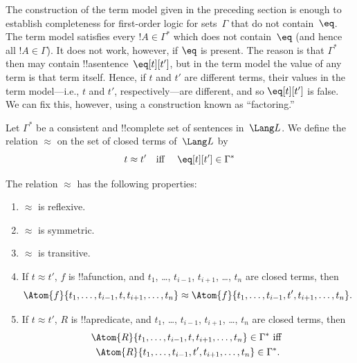 \documentclass[../../../include/open-logic-section]{subfiles}
\begin{document}

\begin{explain}
The construction of the term model given in the preceding section is
enough to establish completeness for first-order logic for
sets~$\Gamma$ that do not contain~$\eq$.  The term model satisfies
every $!A \in \Gamma^*$ which does not contain~$\eq$ (and hence all
$!A \in \Gamma$).  It does not work, however, if $\eq$ is present.
The reason is that $\Gamma^*$ then may contain
!!a{sentence}~$\eq[t][t']$, but in the term model the value of any
term is that term itself.  Hence, if $t$ and $t'$ are different terms,
their values in the term model---i.e., $t$ and $t'$,
respectively---are different, and so $\eq[t][t']$ is false.  We can
fix this, however, using a construction known as ``factoring.''
\end{explain}

\begin{defn}
  Let $\Gamma^*$ be a consistent and !!{complete} set of sentences
  in~$\Lang L$.  We define the relation $\approx$ on the set of closed
  terms of~$\Lang L$ by
  \[
  t \approx t' \text{\quad iff \quad} \eq[t][t'] \in \Gamma^*
  \]
\end{defn}

\begin{prop}
The relation $\approx$ has the following properties:
\begin{enumerate}
\item $\approx$ is reflexive.
\item $\approx$ is symmetric.
\item  $\approx$ is transitive.
\item If $t \approx t'$, $f$ is !!a{function}, and $t_1$, \dots,
  $t_{i-1}$, $t_{i+1}$, \dots, $t_n$ are closed terms, then
\[
\Atom{f}{t_1,\dots, t_{i-1}, t, t_{i+1}, \dots, t_n} \approx
\Atom{f}{t_1,\dots, t_{i-1}, t', t_{i+1}, \dots, t_n}.
\]
\item If $t \approx t'$, $R$ is !!a{predicate}, and $t_1$, \dots,
  $t_{i-1}$, $t_{i+1}$, \dots, $t_n$ are closed terms, then
\begin{multline*}
\Atom{R}{t_1,\dots, t_{i-1}, t, t_{i+1}, \dots, t_n} \in \Gamma^* \text{ iff } \\
\Atom{R}{t_1,\dots, t_{i-1}, t', t_{i+1}, \dots, t_n} \in \Gamma^*.
\end{multline*}
\end{enumerate}
\end{prop}
\end{document}
